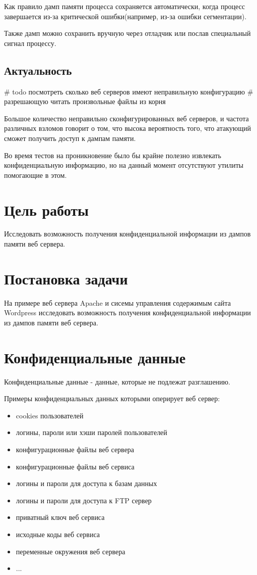 \documentclass[20pt]{article}
\begin{document}
Как правило дамп памяти процесса сохраняется автоматически, когда процесс
завершается из-за критической ошибки(например, из-за ошибки сегментации).

Также дамп можно сохранить вручную через отладчик или послав специальный сигнал
процессу.

\subsection{Актуальность}
\# todo посмотреть сколько веб серверов имеют неправильную конфигурацию
\# разрешающую читать произвольные файлы из корня

Большое количество неправильно сконфигурированных веб серверов, и частота различных
взломов говорит о том, что высока вероятность того, что атакующий сможет получить
доступ к дампам памяти.

Во время тестов на проникновение было бы крайне полезно извлекать конфиденциальную
информацию, но на данный момент отсутствуют утилиты помогающие в этом.

\newpage

\section{Цель работы}
Исследовать возможность получения конфиденциальной информации из дампов памяти веб сервера.

\newpage

\section{Постановка задачи}
На примере веб сервера Apache и сисемы управления содержимым сайта Wordpress
исследовать возможность получения конфиденциальной информации из дампов памяти
веб сервера.

\newpage

\section{Конфиденциальные данные}
Конфиденциальные данные - данные, которые не подлежат разглашению.

Примеры конфиденциальных данных которыми оперирует веб сервер:

\begin{itemize}
  \item cookies пользователей
  \item логины, пароли или хэши паролей пользователей
  \item конфигурационные файлы веб сервера
  \item конфигурационные файлы веб сервиса
  \item логины и пароли для доступа к базам данных
  \item логины и пароли для доступа к FTP сервер
  \item приватный ключ веб сервиса
  \item исходные коды веб сервиса
  \item переменные окружения веб сервера
  \item ...
\end{itemize}
\end{document}
